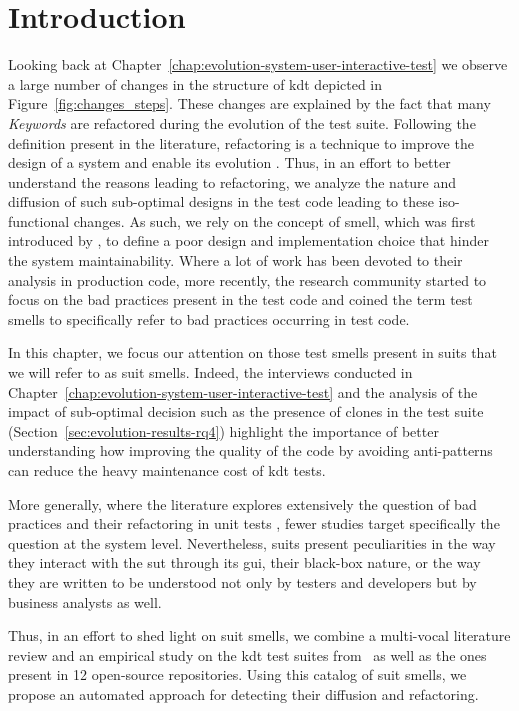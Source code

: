 \section{Introduction}


Looking back at Chapter~\ref{chap:evolution-system-user-interactive-test} we observe a large number of changes in the structure of \gls{kdt} depicted in Figure~\ref{fig:changes_steps}. These changes are explained by the fact that many \emph{Keywords} are refactored during the evolution of the test suite. Following the definition present in the literature, refactoring is a technique to improve the design of a system and enable its evolution \cite{Fowler1999}. Thus, in an effort to better understand the reasons leading to refactoring, we analyze the nature and diffusion of such sub-optimal designs in the test code leading to these iso-functional changes. As such, we rely on the concept of smell, which was first introduced by \textcite{Fowler1999}, to define a  poor design and implementation choice that hinder the system maintainability. Where a lot of work has been devoted to their analysis in production code, more recently, the research community started to focus on the bad practices present in the test code \cite{VanDeursen2001, Meszaros2007, Reichhart2007, VanRompaey2007, Chen2012, Hauptmann2013, Bavota2015, Tufano2016, Bowes2017, Kim2020, Peruma2020} and coined the term test smells to specifically refer to bad practices occurring in test code.

In this chapter, we focus our attention on those test smells present in \gls{suit}s that we will refer to as \gls{suit} smells. Indeed, the interviews conducted in Chapter~\ref{chap:evolution-system-user-interactive-test} and the analysis of the impact of sub-optimal decision such as the presence of clones in the test suite (Section~\ref{sec:evolution-results-rq4}) highlight the importance of better understanding how improving the quality of the code by avoiding anti-patterns can reduce the heavy maintenance cost of \gls{kdt} tests.

More generally, where the literature explores extensively the question of bad practices and their refactoring in unit tests \cite{VanDeursen2001, Meszaros2007, Reichhart2007, VanRompaey2007, Bavota2015, Tufano2016, Bowes2017, Kim2020, Peruma2020}, fewer studies \cite{Chen2012, Hauptmann2013} target specifically the question at the system level. Nevertheless, \gls{suit}s present peculiarities in the way they interact with the \gls{sut} through its \gls{gui}, their black-box nature, or the way they are written to be understood not only by testers and developers but by business analysts as well. 

Thus, in an effort to shed light on \gls{suit} smells, we combine a multi-vocal literature review and an empirical study on the \gls{kdt} test suites from \BGL\ as well as the ones present in 12 open-source repositories. Using this catalog of \gls{suit} smells, we propose an automated approach for detecting their diffusion and refactoring.

